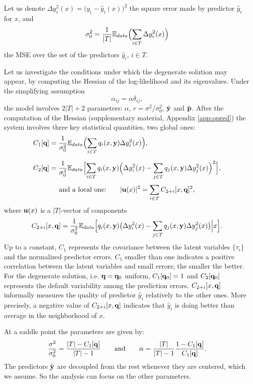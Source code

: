 Let us denote $\Delta y_i^2(x)= \bigl(y_i-\hat y_i(x)\bigr)^2$ the square error made by predictor $\hat y_i$ for $x$, and 
\[
\sigma_0^2 = \frac{1}{|T|}{\mathbb E}_{data}\Bigl(\sum_{i \in T } \Delta y_i^2(x)\Bigr)
\]
the  MSE over the set of the predictors $\hat y_i$, $i \in T$. 

Let us investigate the conditions under which the degenerate solution may appear, by computing the Hessian of the log-likelihood and its eigenvalues. Under the simplifying assumption
\[
\alpha_{ij} = \alpha \delta_{ij},
\]
the model involves $2\vert T\vert+2$ parameters: $\alpha$, $r = \sigma^2/\sigma_0^2$, $\hat {\bf y}$ and $\hat{\bf p}$. After the computation of the Hessian (supplementary material, Appendix \ref{app:opred}) the system involves three key statistical quantities, two global ones:
\begin{align}
C_1[{\bf q}] &= \frac{1}{\sigma_0^2}{\mathbb E}_{data}\Bigl(\sum_{i \in T} q_i(x,{\bf y})\Delta y_i^2(x)\Bigr),\label{def:C1}\\[0.2cm]
C_2[{\bf q}] &= \frac{1}{\sigma_0^4}{\mathbb E}_{data}\Bigl[\sum_{i\in T}q_i(x,{\bf y})\Bigl(\Delta y_i^2(x)-\sum_{j \in T} q_j(x,{\bf y})\Delta y_j^2(x)\Bigr)^2\Bigr],\label{def:C2}
\end{align}
\[
\text{and a local one:}\qquad \vert {\bf u}(x)\vert^2 = \sum_{i\in T} C_{2+i}[x,{\bf q}]^2,
\]
where ${\bf u}(x)$ is a $\vert T\vert$-vector of components 
\[
C_{2+i}[x,{\bf q}] = \frac{1}{\sigma_0^2}{\mathbb E}_{data}
\Bigl[ q_i(x,{\bf y})\bigl(\Delta y_i^2(x)-\sum_{j \in T} q_j(x,{\bf y})\Delta y_j^2(x)\bigr)\Big\vert x \Bigr].
\]
Up to a constant, $C_1$ represents the covariance between the latent variables $\{\tau_i\}$ and the normalized predictor errors. $C_1$ smaller than one 
indicates a positive correlation between the latent variables and small errors; the smaller the better. For the degenerate solution, i.e. ${\bf q}={\bf q}_{0}$ uniform, $C_1[{\bf q}_{0}]=1$ and $C_2[{\bf q}_{0}]$
represents the default variability among the prediction errors. $C_{2+i}[x,{\bf q}]$ informally measures the quality of predictor $\hat y_i$ relatively to the other ones.
More precisely, a negative value of  $C_{2+i}[x,{\bf q}]$ indicates that $\hat y_i$ is doing better than average in the neighborhood of $x$.  

At a saddle point the parameters are given by:
\[
\frac{\sigma^2}{\sigma_0^2} = \frac{\vert T\vert-C_1[{\bf q}]}{\vert T\vert-1} \qquad\text{and}\qquad
\alpha = \frac{\vert T\vert}{\vert T\vert-1}\frac{1-C_1[{\bf q}]}{C_1[{\bf q}]}.
\]
The predictors $\hat {\bf y}$ are decoupled from  the rest whenever they are centered, which we assume. So the analysis can focus on the other parameters. 

